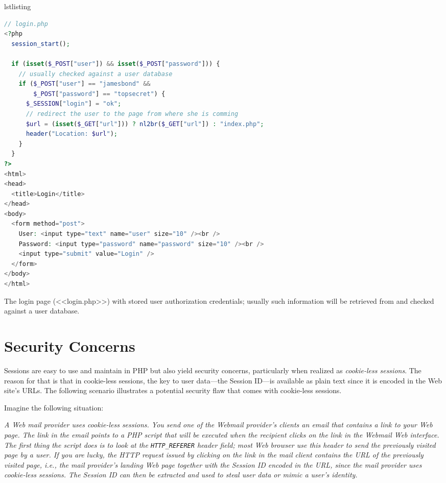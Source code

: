 \documentclass[a4paper, justified, notoc]{tufte-handout} %
\makeatletter
\newenvironment{listing}[1][htbp]
  {\ifvmode\else\unskip\fi\begin{@tufte@float}[#1]{lstlisting}{}}
  {\end{@tufte@float} } %
\makeatother
\begin{document}
\begin{listing}
\begin{lstlisting}[language=PHP]
// login.php
<?php
  session_start();

  if (isset($_POST["user"]) && isset($_POST["password"])) {
    // usually checked against a user database
    if ($_POST["user"] == "jamesbond" && 
        $_POST["password"] == "topsecret") {
      $_SESSION["login"] = "ok";
      // redirect the user to the page from where she is comming
      $url = (isset($_GET["url"])) ? nl2br($_GET["url"]) : "index.php";
      header("Location: $url");
    }
  }
?>
<html>
<head>
  <title>Login</title>
</head>
<body>
  <form method="post">
    User: <input type="text" name="user" size="10" /><br />
    Password: <input type="password" name="password" size="10" /><br />
    <input type="submit" value="Login" />
  </form>
</body>
</html>
\end{lstlisting}
	\caption{The login page (<<login.php>>) with stored user authorization credentials; usually such information will be retrieved from and checked against a user database.}
	\label{login_page}
\end{listing}

\newpage
\section{Security Concerns} %
\label{sec:security_concerns}
Sessions are easy to use and maintain in PHP but also yield security concerns, particularly when realized as \emph{cookie-less sessions}. 
The reason for that is that in cookie-less sessions, the key to user data---the Session ID---is available as plain text since it is encoded in the Web site's URLs.
The following scenario illustrates a potential security flaw that comes with cookie-less sessions.

Imagine the following situation:

\emph{A Web mail provider uses cookie-less sessions.
You send one of the Webmail provider's clients an email that contains a link to your Web page.
The link in the email points to a PHP script that will be executed when the recipient clicks on the link in the Webmail Web interface.
The first thing the script does is to look at the \texttt{HTTP\_REFERER} header field; 
most Web browser use this header to send the previously visited page by a user. 
If you are lucky, the HTTP request issued by clicking on the link in the mail client contains the URL of the previously visited page, i.e., the mail provider's landing Web page together with the Session ID encoded in the URL, since the mail provider uses cookie-less sessions. The Session ID can then be extracted and used to steal user data or mimic a user's identity.}
\end{document}
